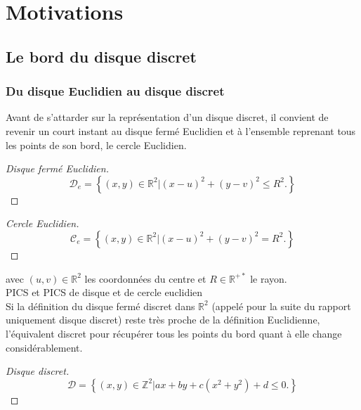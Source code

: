 \section{Motivations}

\subsection{Le bord du disque discret}

\subsubsection{Du disque Euclidien au disque discret}

Avant de s'attarder sur la représentation d'un disque discret, il convient de revenir un court instant au disque fermé Euclidien et à l'ensemble reprenant tous les points de son bord, le cercle Euclidien.

\begin{proof}[Disque fermé Euclidien]
  $$\mathcal{D}_e =  \left\{ (x,y) \in \mathbb{R}^{2} |  (x - u)^2 + (y - v)^2 \leq R^2. \right\}$$
\end{proof}

\begin{proof}[Cercle Euclidien]
  $$\mathcal{C}_e =  \left\{ (x,y) \in \mathbb{R}^{2} |  (x - u)^2 + (y - v)^2 = R^2. \right\}$$
\end{proof}

avec $(u,v) \in \mathbb{R}^{2}$ les coordonnées du centre et $R \in \mathbb{R}^{+*}$ le rayon.\\

PICS et PICS de disque et de cercle euclidien\\

Si la définition du disque fermé discret dans $\mathbb{R}^{2}$ (appelé pour la suite du rapport uniquement disque discret) reste très proche de la définition Euclidienne, l'équivalent discret pour récupérer tous les points du bord quant à elle change considérablement.

\begin{proof}[Disque discret]
  $$\mathcal{D} =  \left\{ (x,y) \in \mathbb{Z}^{2} |  ax + by + c(x^2 + y^2) + d \leq 0. \right\}$$
\end{proof}

